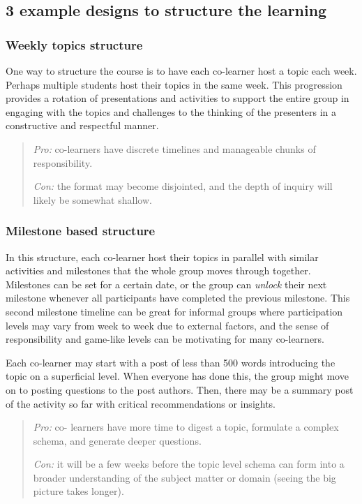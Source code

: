 \subsection{3 example designs to structure the learning}

\subsubsection{Weekly topics structure}

One way to structure the course is to have each co-learner host a topic
each week. Perhaps multiple students host their topics in the same week.
This progression provides a rotation of presentations and activities to
support the entire group in engaging with the topics and challenges to
the thinking of the presenters in a constructive and respectful manner.

\begin{quote}
\emph{Pro:} co-learners have discrete timelines and manageable chunks of
responsibility.

\emph{Con:} the format may become disjointed, and the depth of inquiry
will likely be somewhat shallow.
\end{quote}

\subsubsection{Milestone based structure}

In this structure, each co-learner host their topics in parallel with
similar activities and milestones that the whole group moves through
together. Milestones can be set for a certain date, or the group can
\emph{unlock} their next milestone whenever all participants have
completed the previous milestone. This second milestone timeline can be
great for informal groups where participation levels may vary from week
to week due to external factors, and the sense of responsibility and
game-like levels can be motivating for many co-learners.

Each co-learner may start with a post of less than 500 words introducing
the topic on a superficial level. When everyone has done this, the group
might move on to posting questions to the post authors. Then, there may
be a summary post of the activity so far with critical recommendations
or insights.

\begin{quote}
\emph{Pro:} co- learners have more time to digest a topic, formulate a
complex schema, and generate deeper questions.

\emph{Con:} it will be a few weeks before the topic level schema can
form into a broader understanding of the subject matter or domain
(seeing the big picture takes longer).
\end{quote}

